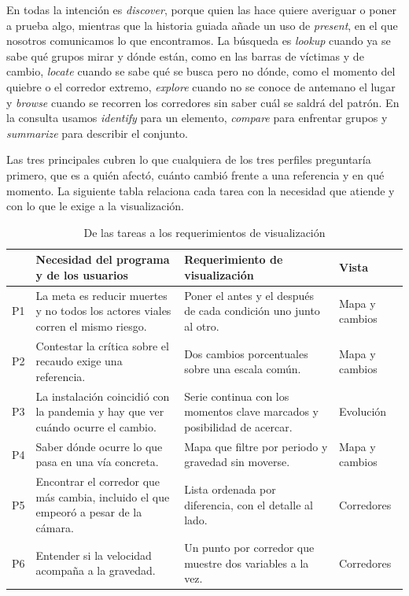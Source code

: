 \documentclass[10pt,a4paper]{article}
\begin{document}
En todas la intención es \textit{discover}, porque quien las hace quiere averiguar o poner a prueba algo, mientras que la historia guiada añade un uso de \textit{present}, en el que nosotros comunicamos lo que encontramos. La búsqueda es \textit{lookup} cuando ya se sabe qué grupos mirar y dónde están, como en las barras de víctimas y de cambio, \textit{locate} cuando se sabe qué se busca pero no dónde, como el momento del quiebre o el corredor extremo, \textit{explore} cuando no se conoce de antemano el lugar y \textit{browse} cuando se recorren los corredores sin saber cuál se saldrá del patrón. En la consulta usamos \textit{identify} para un elemento, \textit{compare} para enfrentar grupos y \textit{summarize} para describir el conjunto.

Las tres principales cubren lo que cualquiera de los tres perfiles preguntaría primero, que es a quién afectó, cuánto cambió frente a una referencia y en qué momento. La siguiente tabla relaciona cada tarea con la necesidad que atiende y con lo que le exige a la visualización.

\begin{table}[H]\centering\small
\begin{tabularx}{\linewidth}{lLLP{3cm}}
\toprule
 & \textbf{Necesidad del programa y de los usuarios} & \textbf{Requerimiento de visualización} & \textbf{Vista}\\
\midrule
P1 & La meta es reducir muertes y no todos los actores viales corren el mismo riesgo. & Poner el antes y el después de cada condición uno junto al otro. & Mapa y cambios\\
P2 & Contestar la crítica sobre el recaudo exige una referencia. & Dos cambios porcentuales sobre una escala común. & Mapa y cambios\\
P3 & La instalación coincidió con la pandemia y hay que ver cuándo ocurre el cambio. & Serie continua con los momentos clave marcados y posibilidad de acercar. & Evolución\\
P4 & Saber dónde ocurre lo que pasa en una vía concreta. & Mapa que filtre por periodo y gravedad sin moverse. & Mapa y cambios\\
P5 & Encontrar el corredor que más cambia, incluido el que empeoró a pesar de la cámara. & Lista ordenada por diferencia, con el detalle al lado. & Corredores\\
P6 & Entender si la velocidad acompaña a la gravedad. & Un punto por corredor que muestre dos variables a la vez. & Corredores\\
\bottomrule
\end{tabularx}
\caption{De las tareas a los requerimientos de visualización}
\end{table}
\end{document}

